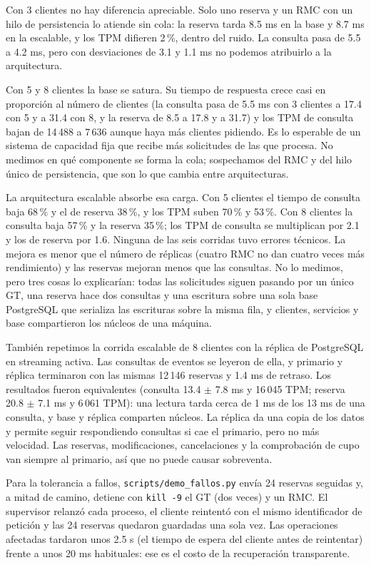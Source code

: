 \documentclass[10pt, a4paper]{article}
\begin{document}
	Con 3 clientes no hay diferencia apreciable. Solo uno reserva y un RMC con un hilo de persistencia lo atiende sin cola: la reserva tarda 8.5 ms en la base y 8.7 ms en la escalable, y los TPM difieren 2\,\%, dentro del ruido. La consulta pasa de 5.5 a 4.2 ms, pero con desviaciones de 3.1 y 1.1 ms no podemos atribuirlo a la arquitectura.

	Con 5 y 8 clientes la base se satura. Su tiempo de respuesta crece casi en proporción al número de clientes (la consulta pasa de 5.5 ms con 3 clientes a 17.4 con 5 y a 31.4 con 8, y la reserva de 8.5 a 17.8 y a 31.7) y los TPM de consulta bajan de 14\,488 a 7\,636 aunque haya más clientes pidiendo. Es lo esperable de un sistema de capacidad fija que recibe más solicitudes de las que procesa. No medimos en qué componente se forma la cola; sospechamos del RMC y del hilo único de persistencia, que son lo que cambia entre arquitecturas.

	La arquitectura escalable absorbe esa carga. Con 5 clientes el tiempo de consulta baja 68\,\% y el de reserva 38\,\%, y los TPM suben 70\,\% y 53\,\%. Con 8 clientes la consulta baja 57\,\% y la reserva 35\,\%; los TPM de consulta se multiplican por 2.1 y los de reserva por 1.6. Ninguna de las seis corridas tuvo errores técnicos. La mejora es menor que el número de réplicas (cuatro RMC no dan cuatro veces más rendimiento) y las reservas mejoran menos que las consultas. No lo medimos, pero tres cosas lo explicarían: todas las solicitudes siguen pasando por un único GT, una reserva hace dos consultas y una escritura sobre una sola base PostgreSQL que serializa las escrituras sobre la misma fila, y clientes, servicios y base compartieron los núcleos de una máquina.

	También repetimos la corrida escalable de 8 clientes con la réplica de PostgreSQL en streaming activa. Las consultas de eventos se leyeron de ella, y primario y réplica terminaron con las mismas 12\,146 reservas y 1.4 ms de retraso. Los resultados fueron equivalentes (consulta 13.4 $\pm$ 7.8 ms y 16\,045 TPM; reserva 20.8 $\pm$ 7.1 ms y 6\,061 TPM): una lectura tarda cerca de 1 ms de los 13 ms de una consulta, y base y réplica comparten núcleos. La réplica da una copia de los datos y permite seguir respondiendo consultas si cae el primario, pero no más velocidad. Las reservas, modificaciones, cancelaciones y la comprobación de cupo van siempre al primario, así que no puede causar sobreventa.

	Para la tolerancia a fallos, \texttt{scripts/demo\_fallos.py} envía 24 reservas seguidas y, a mitad de camino, detiene con \texttt{kill -9} el GT (dos veces) y un RMC. El supervisor relanzó cada proceso, el cliente reintentó con el mismo identificador de petición y las 24 reservas quedaron guardadas una sola vez. Las operaciones afectadas tardaron unos 2.5 s (el tiempo de espera del cliente antes de reintentar) frente a unos 20 ms habituales: ese es el costo de la recuperación transparente.
\end{document}
